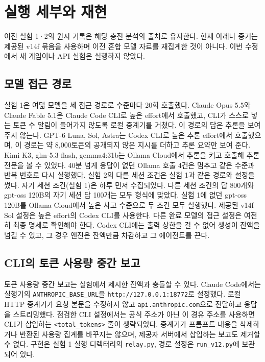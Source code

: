 \section{실행 세부와 재현}\label{app:design}
이전 실험 1·2의 원시 기록은 해당 충전 분석의 출처로 유지한다. 현재 아레나 증거는 제공된 v14f 묶음을 사용하며 이전 혼합 모델 자료를 재집계한 것이 아니다. 이번 수정에서 새 게임이나 API 실험은 실행하지 않았다.

\subsection{모델 접근 경로}\label{app:models}
실험 1은 여덟 모델을 세 접근 경로로 수준마다 20회 호출했다. Claude Opus 5.5와 Claude Fable 5.1은 Claude Code CLI로 높은 effort에서 호출했고, CLI가 스스로 넣는 토큰 수 알림이 들어가지 않도록 로컬 중계기를 거쳤다. 이 경로의 답은 추론을 보여 주지 않는다. GPT-6 Luna, Sol, Astra는 Codex CLI로 높은 추론 effort에서 호출했으며, 이 경로는 약 8,000토큰의 공개되지 않은 지시를 더하고 추론 요약만 보여 준다. Kimi K3, glm-5.3-flash, gemma4:31b는 Ollama Cloud에서 추론을 켜고 호출해 추론 전문을 볼 수 있었다. 40분 넘게 응답이 없던 Ollama 호출 4건은 멈추고 같은 수준과 반복 번호로 다시 실행했다. 실험 2의 다른 세션 조건은 실험 1과 같은 경로와 설정을 썼다. 자기 세션 조건(실험 1)은 하루 먼저 수집되었다. 다른 세션 조건의 답 800개와 gpt-oss 120B의 자기 세션 답 100개는 모두 형식에 맞았다. 실험 1에 없던 gpt-oss 120B를 Ollama Cloud에서 높은 사고 수준으로 두 조건 모두 실행했다. 제공된 v14f Sol 설정은 높은 effort의 Codex CLI를 사용한다. 다른 완료 모델의 접근 설정은 여전히 최종 명세로 확인해야 한다. Codex CLI에는 출력 상한을 걸 수 없어 생성이 잔액을 넘길 수 있고, 그 경우 엔진은 잔액만큼 차감하고 그 에이전트를 끈다.

\subsection{CLI의 토큰 사용량 중간 보고}\label{app:cli-reminders}
토큰 사용량 중간 보고는 실험에서 제시한 잔액과 충돌할 수 있다. Claude Code에서는 실행기의 \texttt{ANTHROPIC\_BASE\_URL}을 \texttt{http://127.0.0.1:18772}로 설정했다. 로컬 HTTP 중계기가 요청 본문을 수정하지 않고 \texttt{api.anthropic.com}으로 전달하고 응답을 스트리밍했다. 점검한 CLI 설정에서는 공식 주소가 아닌 이 경유 주소를 사용하면 CLI가 삽입하는 \texttt{<total\_tokens>} 줄이 생략되었다. 중계기가 프롬프트 내용을 삭제하거나 반환된 사용량 집계를 바꾸지는 않으며, 제공자 서버에서 삽입하는 보고도 제거할 수 없다. 구현은 실험 1 실행 디렉터리의 \texttt{relay.py}, 경로 설정은 \texttt{run\_v12.py}에 보관되어 있다.


